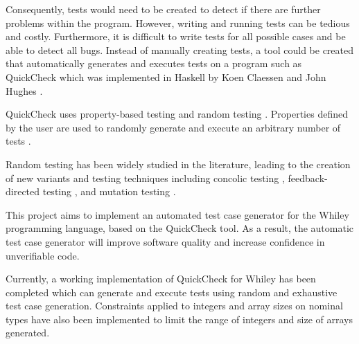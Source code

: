 Consequently, tests would need to be created to detect if there are further problems within the program. However, writing and running tests can be tedious and costly. Furthermore, it is difficult to write tests for all possible cases and be able to detect all bugs. Instead of manually creating tests, a tool could be created that automatically generates and executes tests on a program such as QuickCheck which was implemented in Haskell by Koen Claessen and John Hughes \cite{QClightweight}.

QuickCheck uses property-based testing and random testing \cite{QClightweight}. Properties defined by the user are used to randomly generate and execute an arbitrary number of tests \cite{QClightweight}. 

Random testing has been widely studied in the literature, leading to the creation of new variants and testing techniques including concolic testing \cite{CUTE}, feedback-directed testing \cite{randoopAll}, \cite{randoopJava} and mutation testing \cite{evoSuite}.


This project aims to implement an automated test case generator for the Whiley programming language, based on the QuickCheck tool. As a result, the automatic test case generator will improve software quality and increase confidence in unverifiable code. 

Currently, a working implementation of QuickCheck for Whiley has been completed which can generate and execute tests using random and exhaustive test case generation. 
Constraints applied to integers and array sizes on nominal types have also been implemented to limit the range of integers and size of arrays generated.

